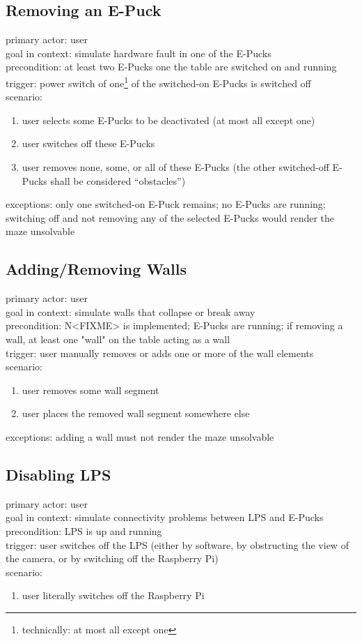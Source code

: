 \documentclass[a4paper,parskip,headheight=38pt]{scrartcl} %
\begin{document}
\subsection{Removing an E-Puck}
primary actor: user \\
goal in context: simulate hardware fault in one of the E-Pucks \\
precondition: at least two E-Pucks one the table are switched on and running \\
trigger: power switch of one\footnote{technically: at most all except one} of the switched-on E-Pucks is switched off \\
scenario: 
\begin{enumerate}[1.]
	\item user selects some E-Pucks to be deactivated (at most all except one) 
	\item user switches off these E-Pucks 
	\item user removes none, some, or all of these E-Pucks (the other switched-off E-Pucks shall be considered \enquote{obstacles}) 
\end{enumerate}
exceptions: only one switched-on E-Puck remains; no E-Pucks are running; switching off and not removing any of the selected E-Pucks would render the maze unsolvable \\

\subsection{Adding/Removing Walls}
primary actor: user \\
goal in context: simulate walls that collapse or break away \\
precondition: N<FIXME> is implemented; E-Pucks are running; if removing a wall, at least one "wall" on the table acting as a wall \\
trigger: user manually removes or adds one or more of the wall elements \\
scenario: 
\begin{enumerate}[1.]
	\item user removes some wall segment 
	\item user places the removed wall segment somewhere else 
\end{enumerate}
exceptions: adding a wall must not render the maze unsolvable \\

\subsection{Disabling LPS}
primary actor: user \\
goal in context: simulate connectivity problems between LPS and E-Pucks \\
precondition: LPS is up and running \\
trigger: user switches off the LPS (either by software, by obstructing the view of the camera, or by switching off the Raspberry Pi) \\
scenario: 
\begin{enumerate}[1.]
	\item user literally switches off the Raspberry Pi 
\end{enumerate}
\end{document}
